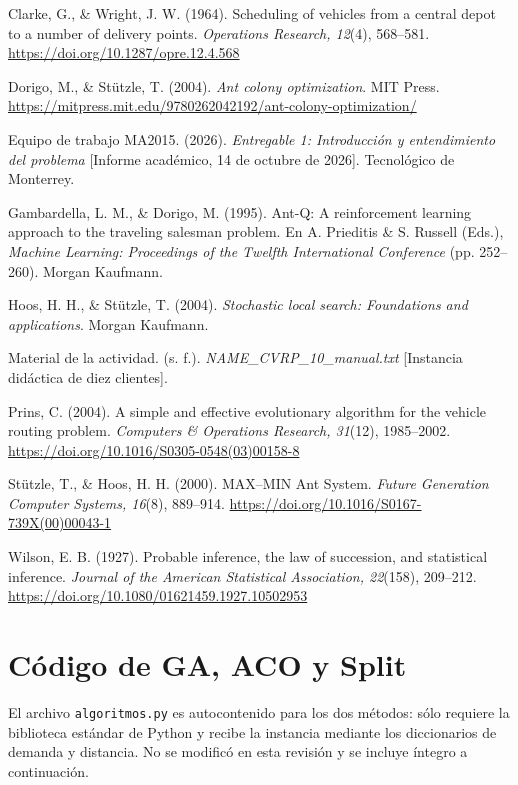 \documentclass[11pt,a4paper]{article}
\numberwithin{equation}{section}
\begin{document}
Clarke, G., \& Wright, J. W. (1964). Scheduling of vehicles from a central depot to a number of delivery points. \emph{Operations Research, 12}(4), 568--581. \url{https://doi.org/10.1287/opre.12.4.568}

Dorigo, M., \& Stützle, T. (2004). \emph{Ant colony optimization}. MIT Press. \url{https://mitpress.mit.edu/9780262042192/ant-colony-optimization/}

Equipo de trabajo MA2015. (2026). \emph{Entregable 1: Introducción y entendimiento del problema} [Informe académico, 14 de octubre de 2026]. Tecnológico de Monterrey.

Gambardella, L. M., \& Dorigo, M. (1995). Ant-Q: A reinforcement learning approach to the traveling salesman problem. En A. Prieditis \& S. Russell (Eds.), \emph{Machine Learning: Proceedings of the Twelfth International Conference} (pp. 252--260). Morgan Kaufmann.

Hoos, H. H., \& Stützle, T. (2004). \emph{Stochastic local search: Foundations and applications}. Morgan Kaufmann.

Material de la actividad. (s. f.). \emph{NAME\_CVRP\_10\_manual.txt} [Instancia didáctica de diez clientes].

Prins, C. (2004). A simple and effective evolutionary algorithm for the vehicle routing problem. \emph{Computers \& Operations Research, 31}(12), 1985--2002. \url{https://doi.org/10.1016/S0305-0548(03)00158-8}

Stützle, T., \& Hoos, H. H. (2000). MAX--MIN Ant System. \emph{Future Generation Computer Systems, 16}(8), 889--914. \url{https://doi.org/10.1016/S0167-739X(00)00043-1}

Wilson, E. B. (1927). Probable inference, the law of succession, and statistical inference. \emph{Journal of the American Statistical Association, 22}(158), 209--212. \url{https://doi.org/10.1080/01621459.1927.10502953}
\setlength{\parskip}{6pt}

\appendix
\section{Código de GA, ACO y Split}

El archivo \texttt{algoritmos.py} es autocontenido para los dos métodos: sólo requiere la biblioteca estándar de Python y recibe la instancia mediante los diccionarios de demanda y distancia. No se modificó en esta revisión y se incluye íntegro a continuación.


\end{document}
